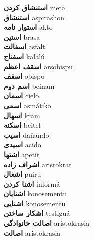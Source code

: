 \textbf{ استنشاق کردن  } meta \\
\textbf{ استنشاق  } aspirashon \\
\textbf{ استوار نامه  } akto \\
\textbf{ استین  } brasa \\
\textbf{ اسفالت  } asfalt \\
\textbf{ اسفناج  } kalalú \\
\textbf{ اسقف اعظم  } arsobispu \\
\textbf{ اسقف  } obispo \\
\textbf{ اسم دوم  } beinam \\
\textbf{ اسمان  } cielo \\
\textbf{ اسمی  } asmátiko \\
\textbf{ اسهال  } kram \\
\textbf{ اسکنه  } beitel \\
\textbf{ اسیب  } dañando \\
\textbf{ اسیدی  } acido \\
\textbf{ اشتها  } apetit \\
\textbf{ اشراف زاده  } aristokrat \\
\textbf{ اشغال  } puiru \\
\textbf{ اشنا کردن  } informá \\
\textbf{ اشنایان  } konosementu \\
\textbf{ اشنایی  } konosementu \\
\textbf{ اشکار ساختن  } testiguá \\
\textbf{ اصالت خانوادگی  } aristokrasia \\
\textbf{ اصالت  } aristokrasia \\
